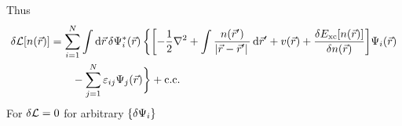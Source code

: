 \documentclass[12pt,a4paper,titlepage]{article}
\newcommand{\trm}[1]{\textrm{#1}} %
\begin{document}
Thus
\begin{equation}
\begin{aligned}
\var{\mathcal{L}[n(\vec{r})]}&=\sum_{i=1}^{N}\int\dd{\vec{r}}\var{\Psi_{i}^{*}(\vec{r})}\bigg\{\qty[-\frac{1}{2}\nabla^{2}+\int\frac{n(\vec{r}^{\prime})}{\abs*{\vec{r}-\vec{r}^{\prime}}}\dd{\vec{r}^{\prime}}+v(\vec{r})+\fdv{E_{\trm{xc}}[n(\vec{r})]}{n(\vec{r})}]\Psi_{i}(\vec{r})\\
&\quad\quad-\sum_{j=1}^{N}\varepsilon_{ij}\Psi_{j}(\vec{r})\bigg\}+\qcc*
\end{aligned}	
\end{equation}
For $\var{\mathcal{L}}=0$ for arbitrary $\{\var{\Psi_{i}}\}$
\begin{equation}
\end{equation}
\end{document}
